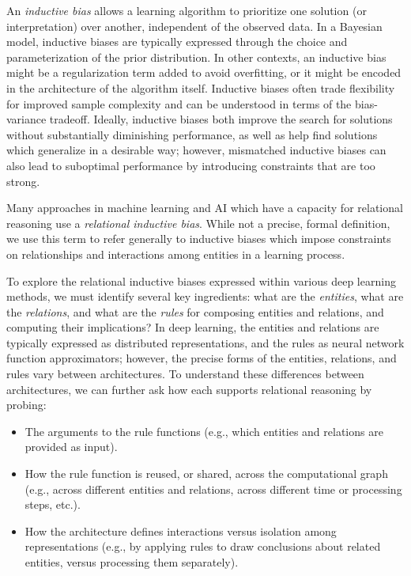 \documentclass[10pt]{book}
\let\defaultmarginpar\marginpar
\renewcommand\marginpar[2][]{\defaultmarginpar{\itshape\color{gray}#2}}
\begin{document}
An \emph{inductive bias}\marginpar{inductive bias} allows a learning algorithm to prioritize one solution (or interpretation) over another, independent of the observed data. In a Bayesian model, inductive biases are typically expressed through the choice and parameterization of the prior distribution. In other contexts, an inductive bias might be a regularization term added to avoid overfitting, or it might be encoded in the architecture of the algorithm itself. Inductive biases often trade flexibility for improved sample complexity and can be understood in terms of the bias-variance tradeoff. Ideally, inductive biases both improve the search for solutions without substantially diminishing performance, as well as help find solutions which generalize in a desirable way; however, mismatched inductive biases can also lead to suboptimal performance by introducing constraints that are too strong.

Many approaches in machine learning and AI which have a capacity for relational reasoning use a \emph{relational inductive bias}\marginpar{relational inductive bias}. While not a precise, formal definition, we use this term to refer generally to inductive biases  which impose constraints on relationships and interactions among entities in a learning process.

To explore the relational inductive biases expressed within various deep learning methods, we must identify several key ingredients: what are the \emph{entities}, what are the \emph{relations}, and what are the \emph{rules} for composing entities and relations, and computing their implications? In deep learning, the entities and relations are typically expressed as distributed representations, and the rules as neural network function approximators; however, the precise forms of the entities, relations, and rules vary between architectures. To understand these differences between architectures, we can further ask how each supports relational reasoning by probing:
\begin{itemize}
    \item The arguments to the rule functions (e.g., which entities and relations are provided as input).
    \item How the rule function is reused, or shared, across the computational graph (e.g., across different entities and relations, across different time or processing steps, etc.).
    \item How the architecture defines interactions versus isolation among representations (e.g., by applying rules to draw conclusions about related entities, versus processing them separately).
\end{itemize}
\end{document}
